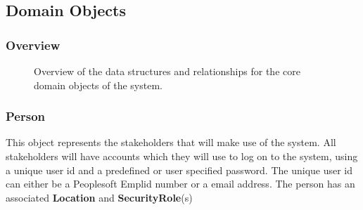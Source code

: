 \documentclass[12pt]{article}
\begin{document}
\newpage
\subsection{Domain Objects}
\subsubsection{Overview}

\begin{figure}[H]
\centering	
{}
\caption{Overview of the data structures and relationships for the core domain objects of the
system.}
\end{figure}

\newpage
\subsubsection{Person}
This object represents the stakeholders that will make use of the system. All stakeholders will have accounts which they will use to log on to the system, using a unique user id and a predefined or user specified password. The unique user id can either be a Peoplesoft Emplid number or a email address. The person has an associated \textbf{Location} and \textbf{SecurityRole}(s)
\end{document}
